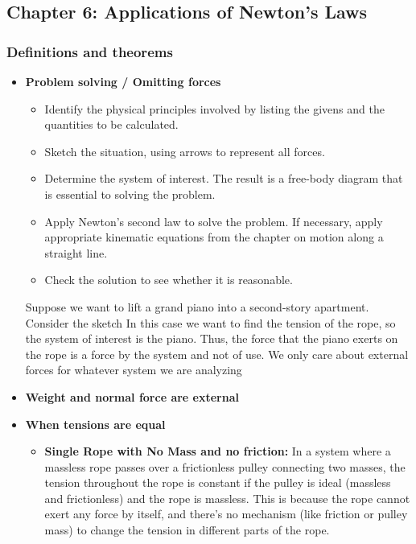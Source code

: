 \documentclass{report}
\begin{document}
    \subsection{Chapter 6: Applications of Newton's Laws}
    \bigbreak \noindent 
    \subsubsection{Definitions and theorems}
    \begin{itemize}
        \item \textbf{Problem solving / Omitting forces } 
            \begin{itemize}
                \item Identify the physical principles involved by listing the givens and the quantities to be calculated.
                \item Sketch the situation, using arrows to represent all forces.
                \item Determine the system of interest. The result is a free-body diagram that is essential to solving the problem.
                \item Apply Newton’s second law to solve the problem. If necessary, apply appropriate kinematic equations from the chapter on motion along a straight line.
                \item Check the solution to see whether it is reasonable.
            \end{itemize}
            Suppose we want to lift a grand piano into a second-story apartment. Consider the sketch
            \bigbreak \noindent
            \bigbreak \noindent 
            In this case we want to find the tension of the rope, so the system of interest is the piano. Thus, the force that the piano exerts on the rope is a force by the system and not of use. We only care about external forces for whatever system we are analyzing
        \item \textbf{Weight and normal force are external}
        \item \textbf{When tensions are equal}
            \begin{itemize}
                \item \textbf{Single Rope with No Mass and no friction:} In a system where a massless rope passes over a frictionless pulley connecting two masses, the tension throughout the rope is constant if the pulley is ideal (massless and frictionless) and the rope is massless. This is because the rope cannot exert any force by itself, and there's no mechanism (like friction or pulley mass) to change the tension in different parts of the rope.

\end{itemize}
\end{itemize}
\end{document}
